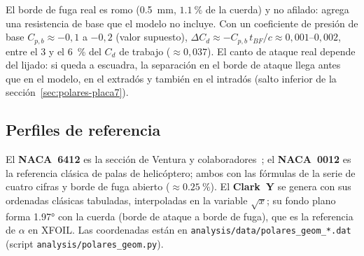 \begin{nota}
El borde de fuga real es romo (\SI{0.5}{mm}, $\SI{1.1}{\percent}$ de la cuerda) y no
afilado: agrega una resistencia de base que el modelo no incluye. Con un coeficiente de
presión de base $C_{p,b}\approx-0{,}1$ a $-0{,}2$ (valor supuesto),
$\Delta C_d\approx-C_{p,b}\,t_{BF}/c\approx0{,}001$--$0{,}002$, entre el 3 y el
\SI{6}{\percent} del $C_d$ de trabajo ($\approx0{,}037$). El canto de ataque real depende
del lijado: si queda a escuadra, la separación en el borde de ataque llega antes que en el
modelo, en el extradós y también en el intradós (salto inferior de la
sección~\ref{sec:polares-placa7}).
\end{nota}

\subsection{Perfiles de referencia}
El \textbf{NACA~6412} es la sección de Ventura y colaboradores~\cite{ventura2022}; el
\textbf{NACA~0012} es la referencia clásica de palas de helicóptero; ambos con las fórmulas
de la serie de cuatro cifras y borde de fuga abierto ($\approx\SI{0.25}{\percent}$). El
\textbf{Clark~Y} se genera con sus ordenadas clásicas tabuladas, interpoladas en la
variable $\sqrt x$; su fondo plano forma \ang{1.97} con la cuerda (borde de ataque a borde
de fuga), que es la referencia de $\alpha$ en XFOIL. Las coordenadas están en
\texttt{analysis/data/polares\_geom\_*.dat} (script \texttt{analysis/polares\_geom.py}).

